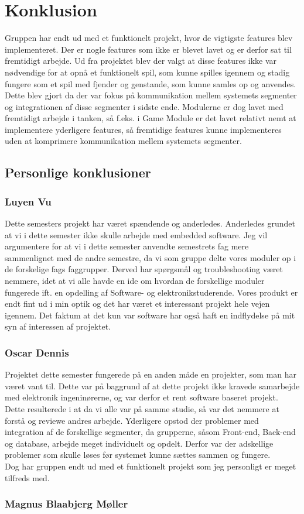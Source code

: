 \section{Konklusion}
Gruppen har endt ud med et funktionelt projekt, hvor de vigtigste features blev implementeret. Der er nogle features som ikke er blevet lavet og er derfor sat til fremtidigt arbejde. Ud fra projektet blev der valgt at disse features ikke var nødvendige for at opnå et funktionelt spil, som kunne spilles igennem og stadig fungere som et spil med fjender og genstande, som kunne samles op og anvendes.\\ Dette blev gjort da der var fokus på kommunikation mellem systemets segmenter og integrationen af disse segmenter i sidste ende. Modulerne er dog lavet med fremtidigt arbejde i tanken, så f.eks. i Game Module er det lavet relativt nemt at implementere yderligere features, så fremtidige features kunne implementeres uden at komprimere kommunikation mellem systemets segmenter.

\subsection{Personlige konklusioner}

\subsubsection{Luyen Vu}
Dette semesters projekt har været spændende og anderledes. Anderledes grundet at vi i dette semester ikke skulle arbejde med embedded software. Jeg vil argumentere for at vi i dette semester anvendte semestrets fag mere sammenlignet med de andre semestre, da vi som gruppe delte vores moduler op i de forskelige fags faggrupper. Derved har spørgsmål og troubleshooting været nemmere, idet at vi alle havde en ide om hvordan de forskellige moduler fungerede ift. en opdelling af Software- og elektronikstuderende. 
Vores produkt er endt fint ud i min optik og det har været et interessant projekt hele vejen igennem. Det faktum at det kun var software har også haft en indflydelse på mit syn af interessen af projektet.

\subsubsection{Oscar Dennis}
Projektet dette semester fungerede på en anden måde en projekter, som man har været vant til. Dette var på baggrund af at dette projekt ikke kravede samarbejde med elektronik ingeninørerne, og var derfor et rent software baseret projekt. Dette resulterede i at da vi alle var på samme studie, så var det nemmere at forstå og reviewe andres arbejde. Yderligere opstod der problemer med integration af de forskellige segmenter, da grupperne, såsom Front-end, Back-end og database, arbejde meget individuelt og opdelt. Derfor var der adskellige problemer som skulle løses før systemet kunne sættes sammen og fungere.\\
Dog har gruppen endt ud med et funktionelt projekt som jeg personligt er meget tilfreds med.



\subsubsection{Magnus Blaabjerg Møller}

